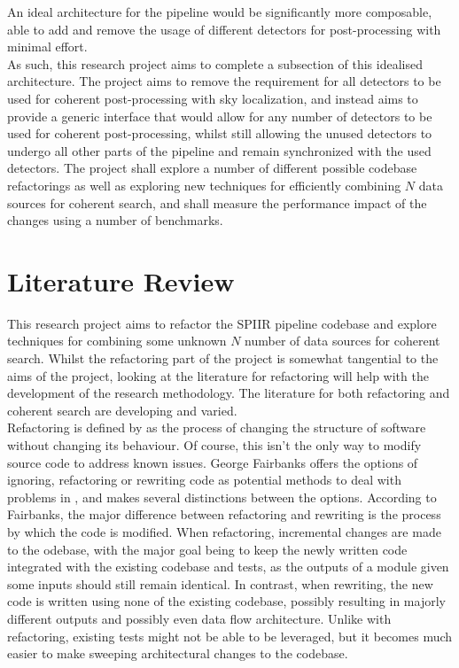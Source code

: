 \documentclass{article}
\begin{document}
An ideal architecture for the pipeline would be significantly more composable, able to add and
remove the usage of different detectors for post-processing with minimal effort.
\\

As such, this research project aims to complete a subsection of this idealised architecture. The
project aims to remove the requirement for all detectors to be used for coherent post-processing
with sky localization, and instead aims to provide a generic interface that would allow for any
number of detectors to be used for coherent post-processing, whilst still allowing the unused
detectors to undergo all other parts of the pipeline and remain synchronized with the used
detectors. The project shall explore a number of different possible codebase refactorings as well as
exploring new techniques for efficiently combining \(N\) data sources for coherent search, and shall
measure the performance impact of the changes using a number of benchmarks.

\section{Literature Review}

This research project aims to refactor the SPIIR pipeline codebase and explore techniques for
combining some unknown \(N\) number of data sources for coherent search. Whilst the refactoring part
of the project is somewhat tangential to the aims of the project, looking at the literature for
refactoring will help with the development of the research methodology. The literature for both
refactoring and coherent search are developing and varied.
\\

Refactoring is defined by \cite{Murphy} as the process of changing the structure of software without
changing its behaviour. Of course, this isn't the only way to modify source code to address known
issues. George Fairbanks offers the options of ignoring, refactoring or rewriting code as potential
methods to deal with problems in \cite{Fairbanks}, and makes several distinctions between the
options. According to Fairbanks, the major difference between refactoring and rewriting is the
process by which the code is modified. When refactoring, incremental changes are made to the
odebase, with the major goal being to keep the newly written code integrated with the existing
codebase and tests, as the outputs of a module given some inputs should still remain identical. In
contrast, when rewriting, the new code is written using none of the existing codebase, possibly
resulting in majorly different outputs and possibly even data flow architecture. Unlike with
refactoring, existing tests might not be able to be leveraged, but it becomes much easier to make
sweeping architectural changes to the codebase.
\end{document}
